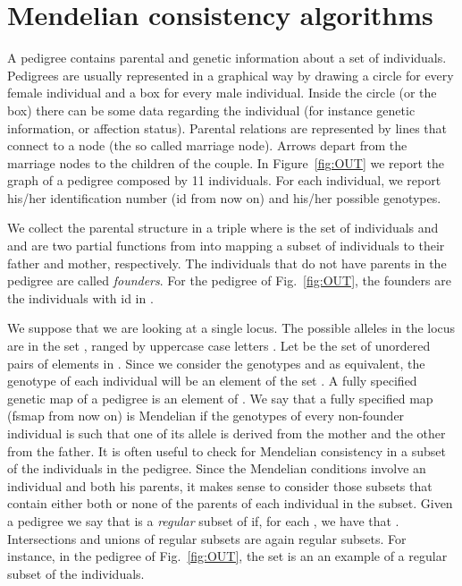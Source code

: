 \section{Mendelian consistency algorithms}
\label{sec:problem}

A pedigree contains parental and genetic information about a set of individuals.
Pedigrees are usually represented in a graphical way by drawing a circle for
every female individual and a box for every male individual. Inside the circle
(or the box) there can be some data regarding the individual (for instance
genetic information, or affection status). Parental relations are represented by
lines that connect to a node (the so called marriage node). Arrows depart from
the marriage nodes to the children of the couple. In Figure~\ref{fig:OUT} we
report the graph of a pedigree composed by 11 individuals. For each individual,
we report his/her identification number (id from now on) and his/her possible
genotypes.

We collect the
parental structure in a triple  where  is the set of individuals
and  and  are two partial functions from  into  mapping a subset
 of individuals to their father and mother,
respectively.  The individuals that do not have parents in the pedigree are
called \emph{founders}. For the pedigree of Fig.~\ref{fig:OUT}, the founders are
the individuals with id in .


We suppose that we are looking at a single locus. The possible alleles in the
locus are in the set , ranged by uppercase case letters . Let  be the set of unordered pairs of elements in
. Since we consider the genotypes  and  as equivalent,
the genotype of each individual will be an element of the set . A
fully specified genetic map of a pedigree  is an element  of
.  We say that a fully specified map (fsmap from now on) is
Mendelian if the genotypes of every non-founder individual is such that one of
its allele is derived from the mother and the other from the father.  It is
often useful to check for Mendelian consistency in a subset of the individuals
in the pedigree. Since the Mendelian conditions involve an individual and both
his parents, it makes sense to consider those subsets that contain either both
or none of the parents of each individual in the subset. Given a pedigree  we say that  is a {\em regular} subset of  if, for each
, we have that . Intersections
and unions of regular subsets are again regular subsets. For instance, in the
pedigree of Fig.~\ref{fig:OUT}, the set  is an an example
of a regular subset of the individuals.

